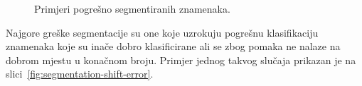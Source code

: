 \begin{figure}[htb]
    \caption{Primjeri pogrešno segmentiranih znamenaka.}
    \label{fig:segmentation-errors}
\end{figure}
Najgore greške segmentacije su one koje uzrokuju pogrešnu klasifikaciju znamenaka koje su inače dobro klasificirane ali
se zbog pomaka ne nalaze na dobrom mjestu u konačnom broju. Primjer jednog takvog slučaja prikazan je na
slici\ \ref{fig:segmentation-shift-error}.
